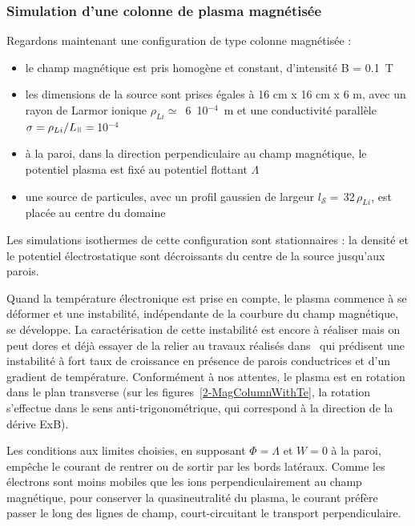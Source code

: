 \begin{refsection}
\subsubsection{Simulation d'une colonne de plasma magnétisée}
Regardons maintenant une configuration de type colonne magnétisée : 

\begin{itemize}
  \item le champ magnétique est pris homogène et constant, d'intensité B = 0.1~T
  \item les dimensions de la source sont prises égales à 16 cm x
  16 cm x 6 m, avec un rayon
  de Larmor ionique $\rho_{Li}\simeq$~6~10$^{-4}$~m et une conductivité
  parallèle $\sigma=\rho_{Li}/L_\para=\,$10$^{-4}$
  \item à la paroi, dans la direction perpendiculaire au champ magnétique, le
  potentiel plasma est fixé au potentiel flottant $\Lambda$
  \item une source de particules, avec un profil gaussien de largeur
  $l_{\mathcal S}=\,$32$\,\rho_{Li}$, est placée au centre du domaine
\end{itemize}

Les simulations isothermes de cette configuration sont stationnaires : la
densité et le potentiel électrostatique sont décroissants du centre de la
source jusqu'aux parois. 

Quand la température électronique est prise en compte,
le plasma commence à se déformer et une instabilité, indépendante de la
courbure du champ magnétique, se développe.
La caractérisation de cette instabilité est encore à réaliser
mais on peut dores et déjà essayer de la relier au travaux
réalisés dans~\parencite{Berk} qui prédisent une instabilité à fort taux de
croissance en présence de parois conductrices et d'un gradient de température.
Conformément à nos attentes, le plasma est en rotation dans le plan transverse (sur les
figures~\ref{2-MagColumnWithTe}, la rotation s'effectue dans le sens
anti-trigonométrique, qui correspond à la direction de la dérive ExB).

Les conditions aux limites choisies, en supposant $\Phi=\Lambda$ et $W=0$ à la
paroi, empêche le courant de rentrer ou de sortir par les bords latéraux. Comme
les électrons sont moins mobiles que les ions perpendiculairement au champ
magnétique, pour conserver
la quasineutralité du plasma, le courant préfère passer le long des lignes de
champ, court-circuitant le transport perpendiculaire.


\end{refsection}
